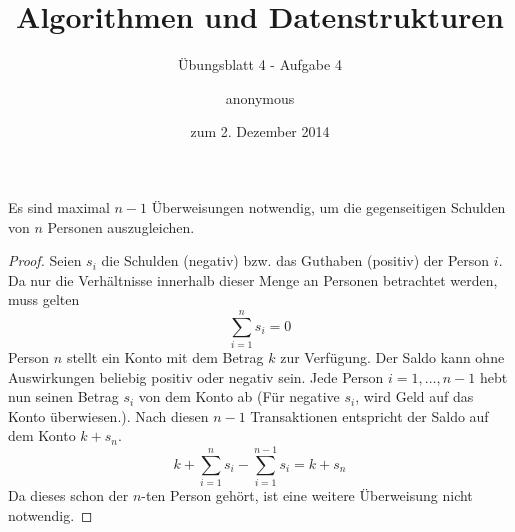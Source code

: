 \documentclass[a4paper]{scrartcl}
\title{Algorithmen und Datenstrukturen}
\subtitle{Übungsblatt 4 - Aufgabe 4}
\author{
    anonymous
}
\date{zum 2. Dezember 2014}
\begin{document}
\maketitle


\begin{behaupt}
    Es sind maximal $n-1$ Überweisungen notwendig, um die gegenseitigen
    Schulden von $n$ Personen auszugleichen.
\end{behaupt}
\begin{proof}
    Seien $s_i$ die Schulden (negativ) bzw. das Guthaben (positiv) der Person
    $i$.
    Da nur die Verhältnisse innerhalb dieser Menge an Personen betrachtet
    werden, muss gelten
    \begin{equation}
        \sum_{i=1}^n s_i = 0
    \end{equation}
    Person $n$ stellt ein Konto mit dem Betrag $k$ zur Verfügung.
    Der Saldo kann ohne Auswirkungen beliebig positiv oder negativ sein.
    Jede Person $i=1, \ldots, n-1$ hebt nun seinen Betrag $s_i$ von dem Konto
    ab (Für negative $s_i$, wird Geld auf das Konto überwiesen.).
    Nach diesen $n-1$ Transaktionen entspricht der Saldo auf dem Konto $k+s_n$.
    \begin{equation}
        k + \sum_{i=1}^n s_i - \sum_{i=1}^{n-1} s_i = k + s_n
    \end{equation}
    Da dieses schon der $n$-ten Person gehört, ist eine weitere Überweisung
    nicht notwendig.
\end{proof}
\end{document}
